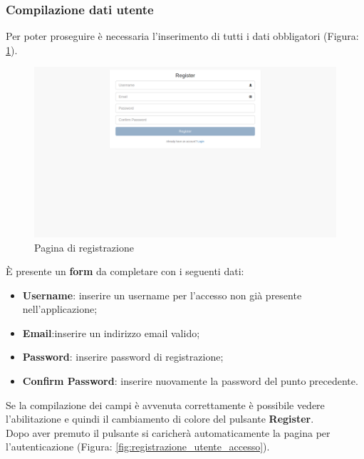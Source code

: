 		\subsubsection{Compilazione dati utente} %
		\label{sec:compilazioni_dati_utente}
			Per poter proseguire è necessaria l'inserimento di tutti i dati obbligatori (Figura: \ref{fig:pagina_di_registrazione}).
			\begin{figure}[htbp]
				\centering
				\centerline{\includegraphics[width=14cm]{images/registrazione_utente.png}}
				\caption{Pagina di registrazione}
				\label{fig:pagina_di_registrazione}
			\end{figure}
			È presente un \textbf{form} da completare con i seguenti dati:
			\begin{itemize}
				\item \textbf{Username}: inserire un username per l'accesso non già presente nell'applicazione;
				\item \textbf{Email}:inserire un indirizzo email valido;
				\item \textbf{Password}: inserire password di registrazione;
				\item \textbf{Confirm Password}: inserire nuovamente la password del punto precedente.
			\end{itemize}
			Se la compilazione dei campi è avvenuta correttamente è possibile vedere l'abilitazione e quindi il cambiamento di colore del pulsante \textbf{Register}.\\
			Dopo aver premuto il pulsante si caricherà automaticamente la pagina per l'autenticazione (Figura: \ref{fig:registrazione_utente_accesso}).


